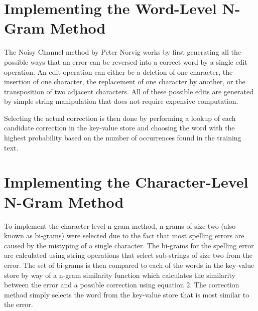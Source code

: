 \section{Implementing the Word-Level N-Gram Method}
The Noisy Channel method by Peter Norvig works by first generating all the possible ways that an error can be reversed into a correct word by a single edit operation. An edit operation can either be a deletion of one character, the insertion of one character, the replacement of one character by another, or the transposition of two adjacent characters. All of these possible edits are generated by simple string manipulation that does not require expensive computation.

Selecting the actual correction is then done by performing a lookup of each candidate correction in the key-value store and choosing the word with the highest probability based on the number of occurrences found in the training text.

\section{Implementing the Character-Level N-Gram Method}
To implement the character-level n-gram method, n-grams of size two (also known as bi-grams) were selected due to the fact that most spelling errors are caused by the mistyping of a single character. The bi-grams for the spelling error are calculated using string operations that select sub-strings of size two from the error. The set of bi-grams is then compared to each of the words in the key-value store by way of a n-gram similarity function which calculates the similarity between the error and a possible correction using equation 2. The correction method simply selects the word from the key-value store that is most similar to the error.
